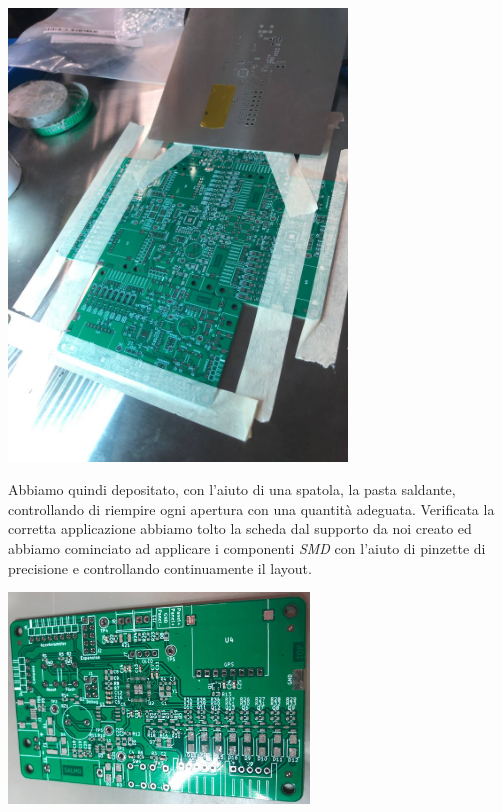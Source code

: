 \begin{center}
    \includegraphics[width=9cm]{figures/image106.jpg}
    \captionsetup{type=figure}
\end{center}

\noindent Abbiamo quindi depositato, con l’aiuto di una spatola, la pasta saldante, controllando di riempire ogni apertura con una quantità adeguata. Verificata la corretta applicazione abbiamo tolto la scheda dal supporto da noi creato ed abbiamo cominciato ad applicare i componenti \textit{SMD} con l’aiuto di pinzette di precisione e controllando continuamente il layout.

\begin{center}
    \includegraphics[width=0.6\textwidth]{figures/image107.jpg}
    \captionsetup{type=figure}
\end{center}

